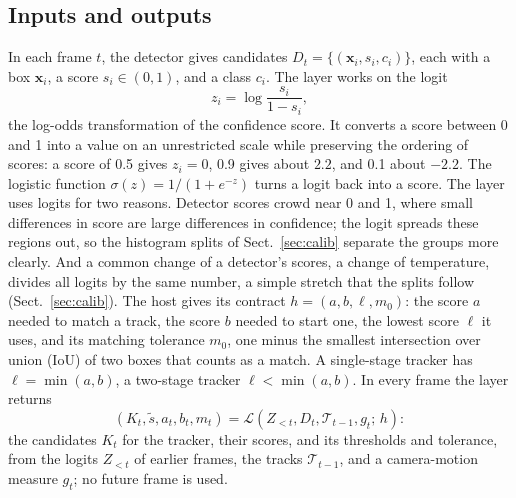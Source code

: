 \documentclass[pdflatex,sn-mathphys-num,iicol]{sn-jnl}
\begin{document}
\subsection{Inputs and outputs}\label{sec:problem}
In each frame $t$, the detector gives candidates $D_t=\{(\mathbf{x}_i,s_i,c_i)\}$, each with a box
$\mathbf{x}_i$, a score $s_i\in(0,1)$, and a class $c_i$. The layer works on the logit
\begin{equation}
z_i=\log\frac{s_i}{1-s_i},
\label{eq:logit}
\end{equation}
the log-odds transformation of the confidence score. It converts a score between 0 and 1 into a
value on an unrestricted scale while preserving the ordering of scores: a score of 0.5 gives
$z_i=0$, 0.9 gives about $2.2$, and 0.1 about $-2.2$. The logistic function
$\sigma(z)=1/(1+e^{-z})$ turns a logit back into a score. The layer uses logits for two reasons.
Detector scores crowd near 0 and 1, where small differences in score are large differences in
confidence; the logit spreads these regions out, so the histogram splits of
Sect.~\ref{sec:calib} separate the groups more clearly. And a common change of a detector's
scores, a change of temperature, divides all logits by the same number, a simple stretch that the
splits follow (Sect.~\ref{sec:calib}). The host gives its contract $h=(a,b,\ell,m_0)$: the score $a$ needed to match a
track, the score $b$ needed to start one, the lowest score $\ell$ it uses, and its matching
tolerance $m_0$, one minus the smallest intersection over union (IoU) of two boxes that counts as a
match. A single-stage tracker has $\ell=\min(a,b)$, a two-stage tracker $\ell<\min(a,b)$. In
every frame the layer returns
\begin{equation}
\left(K_t,\tilde{s},a_t,b_t,m_t\right)=
\mathcal{L}\left(Z_{<t},D_t,\mathcal{T}_{t-1},g_t;\,h\right):
\label{eq:layer}
\end{equation}
the candidates $K_t$ for the tracker, their scores, and its thresholds and tolerance, from the
logits $Z_{<t}$ of earlier frames, the tracks $\mathcal{T}_{t-1}$, and a camera-motion measure
$g_t$; no future frame is used.
\end{document}

